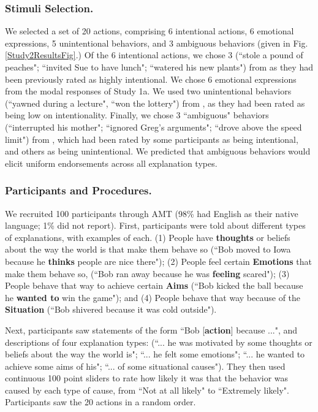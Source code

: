 \documentclass[10pt,letterpaper]{article}
\newcommand{\ndg}[1]{\textcolor{Green}{[ndg: #1]}}
\begin{document}
\subsubsection{Stimuli Selection.} We selected a set of 20 actions, comprising 6 intentional actions, 6 emotional expressions, 5 unintentional behaviors, and 3 ambiguous behaviors (given in Fig. \ref{Study2ResultsFig}.) 
Of the 6 intentional actions, we chose 3 (``stole a pound of peaches"; ``invited Sue to have lunch"; ``watered his new plants") from  as they had been previously rated as  highly intentional.%
We chose 6 emotional expressions from the modal responses of Study 1a. We used two unintentional behaviors (``yawned during a lecture", ``won the lottery") from , as they had been rated as being low on intentionality.
Finally, we chose 3 ``ambiguous" behaviors (``interrupted his mother"; ``ignored Greg's arguments"; ``drove above the speed limit") from , which had been rated by some participants as being intentional, and others as being unintentional.
We predicted that ambiguous behaviors would elicit uniform endorsements across all explanation types.

\subsubsection{Participants and Procedures.} 
We recruited 100 participants through AMT (98\% had English as their native language; 1\% did not report).
First, participants were told about different types of explanations, with examples of each. (1) People have \textbf{thoughts} or beliefs about the way the world is that make them behave so (``Bob moved to Iowa because he \textbf{thinks} people are nice there"); 
(2) People feel certain \textbf{Emotions} that make them behave so, (``Bob ran away because he was \textbf{feeling} scared"); 
(3) People behave that way to achieve certain \textbf{Aims} (``Bob kicked the ball because he \textbf{wanted to} win the game"); and 
(4) People behave that way because of the \textbf{Situation} (``Bob shivered because it was cold outside").

Next, participants saw statements of the form ``Bob [\textbf{action}] because ...", and descriptions of four explanation types: (``... he was motivated by some thoughts or beliefs about the way the world is"; ``... he felt some emotions"; ``... he wanted to achieve some aims of his"; ``... of some situational causes"). They then used continuous 100 point sliders to rate how likely it was that the behavior was caused by each type of cause, from ``Not at all likely" to ``Extremely likely". Participants saw the 20 actions in a random order.
\end{document}
